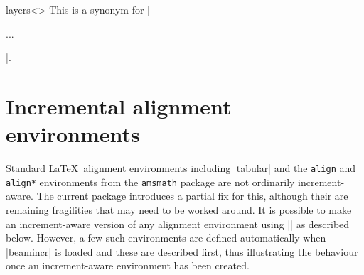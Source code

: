\documentclass[a4paper]{ltxdoc}
\begin{document}
\begin{environment}{{layers<>}
    }
  This is a synonym for |\begin{incrementallayers} ... \end{incrementallayers}|.
\end{environment}





\section{Incremental alignment environments}\label{sec:align}

Standard \LaTeX\ alignment environments including |tabular| and the \texttt{align}
and \texttt{align*} environments from the \texttt{amsmath} package are not
ordinarily increment-aware.  The current package introduces a partial fix for
this, although their are remaining fragilities that may need to be worked
around.  It is possible to make an increment-aware version of any alignment
environment using |\CreateIncrementalAlignmentEnvironment| as described below.
However, a few such environments are defined automatically when |beamincr| is
loaded and these are described first, thus illustrating the behaviour once an
increment-aware environment has been created.
\end{document}
